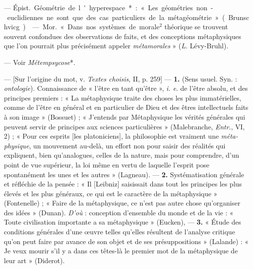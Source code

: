 \begin{itemize}[leftmargin=1cm, label=, itemsep=1pt]
 — \si{Épist.} Géométrie de l'hyperespace* : « Les
géométries
non-euclidiennes ne sont que des cas particuliers de la
métagéométrie » (Brunschvicg).

 — \si{Mor.} « Dans nos systèmes de morale$^2$ théorique se
trouvent souvent confondues des observations de faits, et des conceptions
métaphysiques que l’on pourrait plus précisément appeler
{\it métamorales} » ({\it L.} Lévy-Bruhl).

 — Voir {\it Métempsycose}*.

 — [Sur l'origine du mot, v. {\it Textes choisis}, II,
p. 259] — {\bf 1.} (Sens usuel. Syn. : {\it ontologie}). Connaissance de
« l'être en tant qu'être », {\it i. e.} de l'être absolu, et des principes
premiers : « La métaphysique traite des choses les plus immatérielles, comme
de l'être en général et en particulier de Dieu et des êtres intellectuels
faits à son image » (Bossuet) ; « J'entends par Métaphysique les vérités
générales qui peuvent servir de principes aux sciences
particulières » (Malebranche, {\it Entr.}, VI, 2) ; « Pour ces esprits [les
platoniciens], la philosophie est vraiment une {\it méta-physique}, un
mouvement au-delà, un effort non pour saisir des réalités qui expliquent,
bien qu’analogues, celles de la nature, mais pour comprendre, d’un point de
vue supérieur, la loi même en vertu de laquelle l'esprit pose spontanément
les unes et les autres » (Lagneau). — {\bf 2.} Systématisation générale et
réfléchie de la pensée : « Il [Leibniz] saisissait dans tout les principes
les plus élevés et les plus généraux, ce qui est le caractère de la
métaphysique » (Fontenelle) ; « Faire de la métaphysique, ce n’est pas autre
chose qu'organiser des idées » (Dunan). {\it D'où} : conception d’ensemble du
monde et de la vie : « Toute civilisation importante a sa
métaphysique » (Eucken), — {\bf 3.} « Étude des conditions générales d'une
œuvre telles qu’elles résultent de l'analyse critique qu’on peut faire par
avance de son objet et de ses présuppositions » (Lalande) : « Je veux mourir
s’il y a dans ces têtes-là le premier mot de la métaphysique de leur
art » (Diderot).


\end{itemize}
